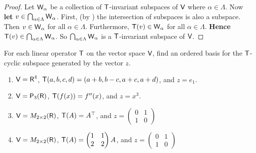 \begin{proof}
Let \(\textsf{W}_{\alpha}\) be a collection of \(\textsf{T}\)-invariant subspaces of \(\textsf{V}\) where \(\alpha \in \Lambda\).
Now \textbf{let} \(v \in \bigcap_{\alpha \in \Lambda} \textsf{W}_{\alpha}\).
First, (by ) the intersection of subspaces is also a subspace.
Then \(v \in \textsf{W}_{\alpha}\) for all \(\alpha \in \Lambda\).
Furthermore, \(\textsf{T}(v) \in \textsf{W}_{\alpha}\) for all \(\alpha \in \Lambda\).
\textbf{Hence} \(\textsf{T}(v) \in \bigcap_{\alpha \in \Lambda} \textsf{W}_{\alpha}\).
So \(\bigcap_{\alpha \in \Lambda} \textsf{W}_{\alpha}\) is a \(\textsf{T}\)-invariant subspace of \(\textsf{V}\).
\end{proof}

\begin{exercise} \label{exercise 5.4.6}
For each linear operator \(\textsf{T}\) on the vector space \(\textsf{V}\), find an ordered basis for the \(\textsf{T}\)-cyclic subspace generated by the vector \(z\).
\begin{enumerate}
\item \(\textsf{V} = \textsf{R}^4\), \(\textsf{T}(a, b, c, d) = (a + b, b - c, a + c, a + d)\), and \(z = e_1\).
\item \(\textsf{V} = \textsf{P}_3(\textsf{R})\), \(\textsf{T}(f(x)) = f''(x)\), and \(z = x^3\).
\item \(\textsf{V} = M_{2 \times 2}(\textsf{R})\), \(\textsf{T}(A) = A^\top\), and \(z = \begin{pmatrix} 0 & 1 \\ 1 & 0 \end{pmatrix}\)
\item \(\textsf{V} = M_{2 \times 2}(\textsf{R})\), \(\textsf{T}(A) = \begin{pmatrix} 1 & 1 \\ 2 & 2 \end{pmatrix} A\), and \(z = \begin{pmatrix} 0 & 1 \\ 1 & 0 \end{pmatrix}\)
\end{enumerate}
\end{exercise}

